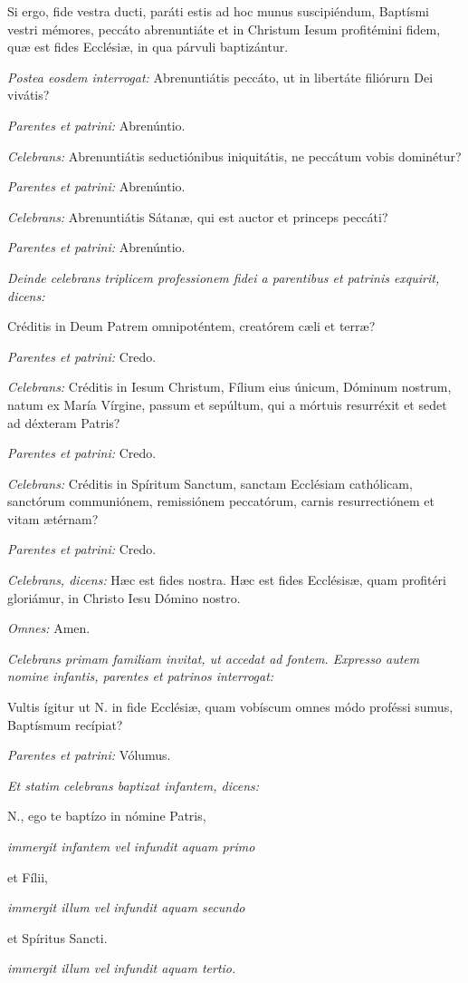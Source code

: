 Si ergo, fide vestra ducti, paráti estis ad hoc munus suscipiéndum, Baptísmi
vestri mémores, peccáto abrenuntiáte et in Christum Iesum profitémini
fidem, quæ est fides Ecclésiæ, in qua párvuli baptizántur.

\textit{Postea eosdem interrogat:} Abrenuntiátis peccáto, ut in libertáte filiórurn Dei vivátis?

\textit{Parentes et patrini:} Abrenúntio.

\textit{Celebrans:} Abrenuntiátis seductiónibus iniquitátis, ne peccátum vobis dominétur?

\textit{Parentes et patrini:} Abrenúntio.

\textit{Celebrans:} Abrenuntiátis Sátanæ, qui est auctor et princeps peccáti?

\textit{Parentes et patrini:} Abrenúntio.

\textit{Deinde celebrans triplicem professionem fidei a parentibus et patrinis exquirit, dicens:}

Créditis in Deum Patrem omnipoténtem, creatórem cæli et terræ?

\textit{Parentes et patrini:} Credo.

\textit{Celebrans:} Créditis in Iesum Christum, Fílium eius únicum, Dóminum nostrum, natum ex
María Vírgine, passum et sepúltum, qui a mórtuis resurréxit et sedet ad déxteram Patris?

\textit{Parentes et patrini:} Credo.

\textit{Celebrans:} Créditis in Spíritum Sanctum, sanctam Ecclésiam cathólicam,
sanctórum communiónem, remissiónem peccatórum, carnis resurrectiónem et vitam ætérnam?

\textit{Parentes et patrini:} Credo.

\textit{Celebrans, dicens:} Hæc est fides nostra. Hæc est fides Ecclésisæ, quam profitéri gloriámur,
in Christo Iesu Dómino nostro.

\textit{Omnes:} Amen.


\textit{Celebrans primam familiam invitat, ut accedat ad fontem. Expresso autem nomine infantis, parentes et patrinos
interrogat:}

Vultis ígitur ut {\color{red}N.} in fide Ecclésiæ, quam vobíscum omnes módo proféssi sumus, Baptísmum recípiat?

\textit{Parentes et patrini:} Vólumus.

\textit{Et statim celebrans baptizat infantem, dicens:}

{\color{red}N.}, ego te baptízo in nómine Patris,

\textit{immergit infantem vel infundit aquam primo}

et Fílii,

\textit{immergit illum vel infundit aquam secundo}

et Spíritus Sancti.

\textit{immergit illum vel infundit aquam tertio.}
